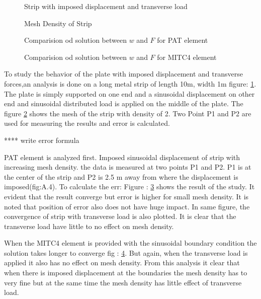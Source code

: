 \documentclass[main.tex]{subfiles}
\begin{document}
\begin{figure}[h!]
\centering

\caption{Strip with imposed displacement and transverse load}
\label{fig:Strip_LOAD_FvsD1}
\end{figure}
\begin{figure}[h!]
\centering

\caption{Mesh Density of Strip}
\label{fig:Strip_Mesh_Density}
\end{figure}
\begin{figure}[h!]
\centering

\caption{Comparision od solution between $w$ and $F$ for PAT element}
\label{fig:Strip_FvsD_PAT}
\end{figure}
\begin{figure}[h!]
\centering

\caption{Comparision od solution between $w$ and $F$ for MITC4 element}
\label{fig:Strip_FvsD_MITC4}
\end{figure}

To study the behavior of the plate with imposed displacement and transverse forces,an analysis is done on a long metal strip of length 10m, width 1m figure: \ref{fig:Strip_LOAD_FvsD1}. The plate is simply supported on  one end and a sinusoidal displacement on other end and sinusoidal distributed load is applied on the middle of the plate. The figure \ref{fig:Strip_Mesh_Density} shows the mesh of the strip with density of 2. Two Point P1 and P2 are used for measuring the results and error is calculated. 

**** write error formula





PAT element is analyzed first. Imposed sinusoidal displacement of strip with increasing mesh density. the data is measured at two points P1 and P2. P1 is at the center of the strip and P2 is 2.5 m away from where the displacement is imposed(fig:A.4). To calculate the err:
Figure :  \ref{fig:Strip_FvsD_PAT} shows the result of the study. It evident that the result converge but error is higher for small mesh density. It is noted that position of error also does not have huge impact. In same figure, the convergence of strip with transverse load is also plotted. It is clear that the transverse load have little to no effect on mesh density. 


When the MITC4 element is provided with the sinusoidal boundary condition the solution takes longer to converge fig : \ref{fig:Strip_FvsD_MITC4}. But again, when the transverse load is applied it also has no effect on mesh density. From this analysis it clear that when there is imposed displacement at the boundaries the mesh density has to very fine but at the same time the mesh density has little effect of transverse load. 
\end{document}
